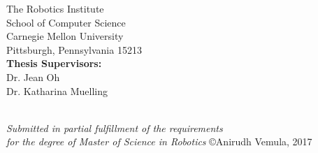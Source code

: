 \begin{center}
\vspace{0.5cm}
{\Large
  The Robotics Institute\\
  School of Computer Science \\
  Carnegie Mellon University\\
  Pittsburgh, Pennsylvania 15213\\
}
\vspace{1cm}
{\Large
{\bf Thesis Supervisors:}\\
Dr. Jean Oh\\
Dr. Katharina Muelling
}
\vspace{1cm}
\par ~ \\
{\large \it Submitted in partial fulfillment of the requirements \\for the degree of Master of Science in Robotics}
\vfill
{\large \copyright Anirudh Vemula, 2017}
\end{center}




